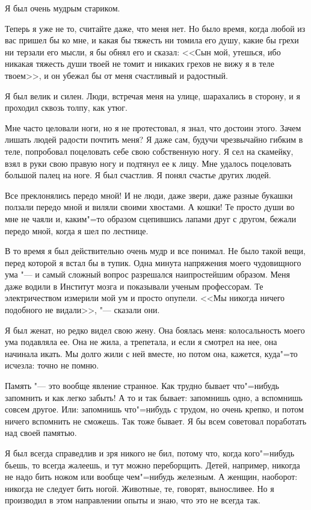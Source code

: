 Я был очень мудрым стариком.

Теперь я уже не то, считайте даже, что меня нет. Но было время, когда 
любой из вас пришел бы ко мне, и какая бы тяжесть ни томила его душу, 
какие бы грехи ни терзали его мысли, я бы обнял его и сказал: <<Сын мой, 
утешься, ибо никакая тяжесть души твоей не томит и никаких грехов не вижу 
я в теле твоем>>, и он убежал бы от меня счастливый и радостный.

Я был велик и силен. Люди, встречая меня на улице, шарахались в сторону, и 
я проходил сквозь толпу, как утюг.

Мне часто целовали ноги, но я не протестовал, я знал, что достоин этого. 
Зачем лишать людей радости почтить меня? Я даже сам, будучи чрезвычайно 
гибким в теле, попробовал поцеловать себе свою собственную ногу. Я сел на 
скамейку, взял в руки свою правую ногу и подтянул ее к лицу. Мне удалось 
поцеловать большой палец на ноге. Я был счастлив. Я понял счастье других 
людей.

Все преклонялись передо мной! И не люди, даже звери, даже разные букашки 
ползали передо мной и виляли своими хвостами. А кошки! Те просто души во 
мне не чаяли и, каким"=то образом сцепившись лапами друг с другом, бежали 
передо мной, когда я шел по лестнице.

В то время я был действительно очень мудр и все понимал. Не было такой 
вещи, перед которой я встал бы в тупик. Одна минута напряжения моего 
чудовищного ума "--- и самый сложный вопрос разрешался наипростейшим 
образом. Меня даже водили в Институт мозга и показывали ученым 
профессорам. Те электричеством измерили мой ум и просто опупели. <<Мы 
никогда ничего подобного не видали>>, "--- сказали они.

Я был женат, но редко видел свою жену. Она боялась меня: колосальность 
моего ума подавляла ее. Она не жила, а трепетала, и если я смотрел на нее, 
она начинала икать. Мы долго жили с ней вместе, но потом она, кажется, 
куда"=то исчезла: точно не помню.

Память "--- это вообще явление странное. Как трудно бывает что"=нибудь 
запомнить и как легко забыть! А то и так бывает: запомнишь одно, а 
вспомнишь совсем другое. Или: запомнишь что"=нибудь с трудом, но очень 
крепко, и потом ничего вспомнить не сможешь. Так тоже бывает. Я бы всем 
советовал поработать над своей памятью.

Я был всегда справедлив и зря никого не бил, потому что, когда кого"=нибудь 
бьешь, то всегда жалеешь, и тут можно переборщить. Детей, например, 
никогда не надо бить ножом или вообще чем"=нибудь железным. А женщин, 
наоборот: никогда не следует бить ногой. Животные, те, говорят, 
выносливее. Но я производил в этом направлении опыты и знаю, что это не 
всегда так.

